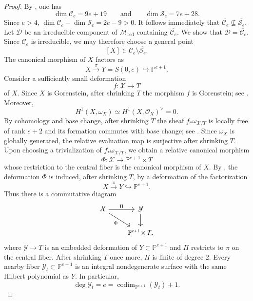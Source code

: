 \documentclass[11pt,twoside]{amsart}
\theoremstyle{plain}
\numberwithin{equation}{section}
\theoremstyle{definition}
\begin{document}
\begin{proof}
By
,
one has
$$
\dim\mathcal C_e=9e+19
\qquad\text{and}\qquad
\dim\mathcal S_e=7e+28.
$$
Since $e>4$, $\dim\mathcal C_e-\dim\mathcal S_e = 2e-9 > 0.
$
It follows immediately that
$\overline{\mathcal C_e}\not\subseteq\overline{\mathcal S_e}.$ \\
Let $\mathcal D$ be an irreducible component of $\mathcal M_{\mathrm{red}}$
containing $\overline{\mathcal C_e}$. We show that $\mathcal D=\overline{\mathcal C_e}$.
Since $\mathcal C_e$ is irreducible, we may therefore choose a general point
$$
[X]\in
\mathcal C_e\setminus\overline{\mathcal S_e}.
$$
The canonical morphism of $X$ factors as
$$
X\xrightarrow{\pi}
Y=S(0,e)
\hookrightarrow
\mathbb P^{e+1}.
$$
Consider a sufficiently small deformation
$$
f:\mathcal X\longrightarrow T
$$
of $X$. Since $X$ is Gorenstein, after shrinking $T$ the morphism $f$ is
Gorenstein; see \cite[Tag~0C09]{stacks-project}. Moreover,
$$
H^1(X,\omega_X)
\simeq
H^1(X,\mathcal O_X)^{\vee}
=
0.
$$
By cohomology and base change, after shrinking $T$ the sheaf
$f_*\omega_{\mathcal X/T}$ is locally free of rank $e+2$ and its formation
commutes with base change; see
\cite[Theorem~III.12.11]{Hartshorne}. Since $\omega_X$ is globally generated,
the relative evaluation map is surjective after shrinking $T$. Upon choosing a
trivialization of $f_*\omega_{\mathcal X/T}$, we obtain a relative canonical
morphism
$$
\Phi:\mathcal X\longrightarrow\mathbb P^{e+1}\times T
$$
whose restriction to the central fiber is the canonical morphism of $X$. By
,
the deformation $\Phi$ is induced, after shrinking $T$, by a deformation of the
factorization
$$
X\xrightarrow{\pi}Y\hookrightarrow\mathbb P^{e+1}.
$$
Thus there is a commutative diagram
$$
\begin{tikzcd}
\mathcal X
\arrow[r,"\Pi"]
\arrow[dr,"\Phi"']
&
\mathcal Y
\arrow[d]
\\
&
\mathbb P^{e+1}\times T,
\end{tikzcd}
$$
where $\mathcal Y\to T$ is an embedded deformation of
$Y\subset\mathbb P^{e+1}$ and $\Pi$ restricts to $\pi$ on the central fiber.
After shrinking $T$ once more, $\Pi$ is finite of degree $2$. Every nearby fiber $\mathcal{Y}_t\subset\mathbb P^{e+1}$ is an integral nondegenerate
surface with the same Hilbert polynomial as $Y$. In particular,
$$
\deg \mathcal{Y}_t=e
=
\operatorname{codim}_{\mathbb P^{e+1}}(\mathcal{Y}_t)+1.
$$
\end{proof}
\end{document}
